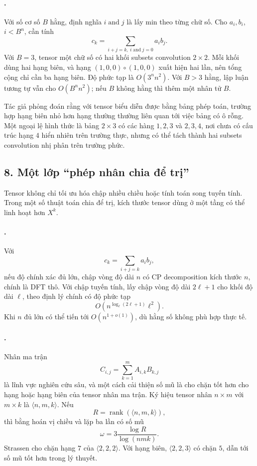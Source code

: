 \documentclass[11pt]{article}
\begin{document}
\paragraph{.}
Với số cơ số \(B\) hằng, định nghĩa \(i\operatorname{and}j\) là lấy min theo
từng chữ số. Cho \(a_i,b_i\), \(i<B^n\), cần tính
\[
  c_k=\sum_{i+j=k,\ i\operatorname{and}j=0}a_i b_j.
\]
Với \(B=3\), tensor một chữ số có hai khối subsets convolution \(2\times 2\).
Mỗi khối dùng hai hạng biên, và hạng \((1,0,0)\circ(1,0,0)\) xuất hiện hai
lần, nên tổng cộng chỉ cần ba hạng biên. Độ phức tạp là \(O(3^n n^2)\). Với
\(B>3\) hằng, lập luận tương tự vẫn cho \(O(B^n n^2)\); nếu \(B\) không hằng
thì thêm một nhân tử \(B\).

Tác giả phỏng đoán rằng với tensor biểu diễn được bằng bảng phép toán, trường
hợp hạng biên nhỏ hơn hạng thường thường liên quan tới việc bảng có ô rỗng.
Một ngoại lệ hình thức là bảng \(2\times 3\) có các hàng \(1,2,3\) và \(2,3,4\),
nơi chưa có cấu trúc hạng \(4\) hiển nhiên trên trường thực, nhưng có thể tách
thành hai subsets convolution nhị phân trên trường phức.

\subsection*{8. Một lớp ``phép nhân chia để trị''}

Tensor không chỉ tối ưu hóa chập nhiều chiều hoặc tính toán song tuyến tính.
Trong một số thuật toán chia để trị, kích thước tensor dùng ở một tầng có thể
linh hoạt hơn \(X^k\).

\paragraph{.}
Với
\[
  c_k=\sum_{i+j=k}a_i b_j,
\]
nếu độ chính xác đủ lớn, chập vòng độ dài \(n\) có CP decomposition kích thước
\(n\), chính là DFT thô. Với chập tuyến tính, lấy chập vòng độ dài \(2\ell+1\)
cho khối độ dài \(\ell\), theo định lý chính có độ phức tạp
\[
  O(n^{\log_\ell(2\ell+1)}\ell^2).
\]
Khi \(n\) đủ lớn có thể tiến tới \(O(n^{1+o(1)})\), dù hằng số không phù hợp
thực tế.

\paragraph{.}
Nhân ma trận
\[
  C_{i,j}=\sum_{k=1}^{m}A_{i,k}B_{k,j}
\]
là lĩnh vực nghiên cứu sâu, và một cách cải thiện số mũ là cho chặn tốt hơn
cho hạng hoặc hạng biên của tensor nhân ma trận. Ký hiệu tensor nhân
\(n\times m\) với \(m\times k\) là \(\langle n,m,k\rangle\). Nếu
\[
  R=\operatorname{rank}(\langle n,m,k\rangle),
\]
thì bằng hoán vị chiều và lặp ba lần có số mũ
\[
  \omega=3\frac{\log R}{\log(nmk)}.
\]
Strassen cho chặn hạng \(7\) của \(\langle 2,2,2\rangle\). Với hạng biên,
\(\langle 2,2,3\rangle\) có chặn \(5\), dẫn tới số mũ tốt hơn trong lý thuyết.
\end{document}

